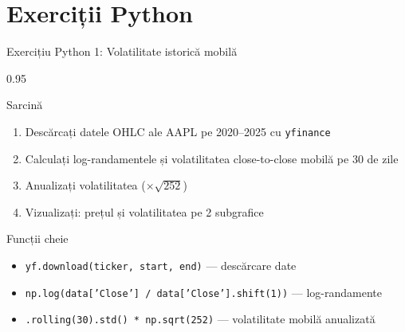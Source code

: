 \documentclass[9pt, aspectratio=169, t]{beamer}
\begin{document}
\section{Exerciții Python}

\begin{frame}[shrink=10]{Exercițiu Python 1: Volatilitate istorică mobilă}
\begin{cminipage}{0.95\textwidth}
    \begin{block}{Sarcină}
    \begin{enumerate}\setlength{\itemsep}{0pt}
        \item Descărcați datele OHLC ale AAPL pe 2020--2025 cu \texttt{yfinance}
        \item Calculați log-randamentele și volatilitatea close-to-close mobilă pe 30 de zile
        \item Anualizați volatilitatea ($\times \sqrt{252}$)
        \item Vizualizați: prețul și volatilitatea pe 2 subgrafice
    \end{enumerate}
    \end{block}

    \vspace{0.2cm}
    \begin{alertblock}{Funcții cheie}
    \begin{itemize}\setlength{\itemsep}{0pt}
        \item \texttt{yf.download(ticker, start, end)} --- descărcare date
        \item \texttt{np.log(data['Close'] / data['Close'].shift(1))} --- log-randamente
        \item \texttt{.rolling(30).std() * np.sqrt(252)} --- volatilitate mobilă anualizată
    \end{itemize}
    \end{alertblock}

\end{cminipage}
\end{frame}
\end{document}
